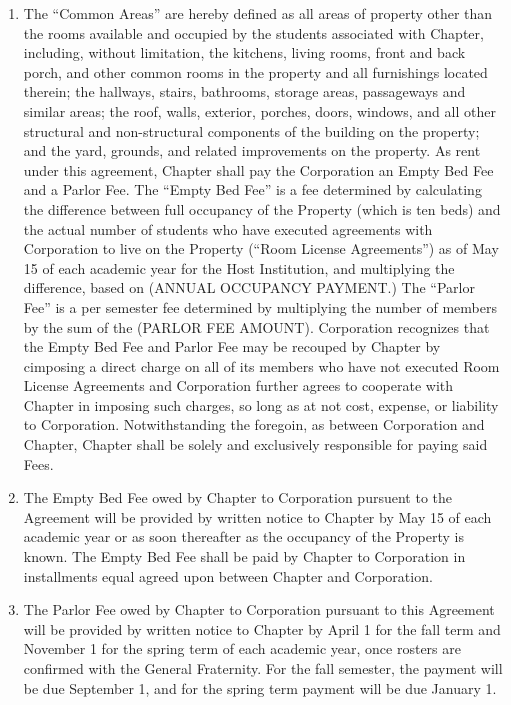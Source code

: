 \documentclass[12pt]{article}
\begin{document}
\begin{enumerate}
        \item The ``Common Areas'' are hereby defined as all areas of property other than the rooms available and occupied by the students associated with Chapter, including, without limitation, the kitchens, living rooms, front and back porch, and other common rooms in the property and all furnishings located therein; the hallways, stairs, bathrooms, storage areas, passageways and similar areas; the roof, walls, exterior, porches, doors, windows, and all other structural and non-structural components of the building on the property; and the yard, grounds, and related improvements on the property.
                As rent under this agreement, Chapter shall pay the Corporation an Empty Bed Fee and a Parlor Fee.
                The ``Empty Bed Fee'' is a fee determined by calculating the difference between full occupancy of the Property (which is ten beds) and the actual number of students who have executed agreements with Corporation to live on the Property (``Room License Agreements'') as of May 15 of each academic year for the Host Institution, and multiplying the difference, based on (ANNUAL OCCUPANCY PAYMENT.)
                The ``Parlor Fee'' is a per semester fee determined by multiplying the number of members by the sum of the (PARLOR FEE AMOUNT).
                Corporation recognizes that the Empty Bed Fee and Parlor Fee may be recouped by Chapter by cimposing a direct charge on all of its members who have not executed Room License Agreements and Corporation further agrees to cooperate with Chapter in imposing such charges, so long as at not cost, expense, or liability to Corporation.
                Notwithstanding the foregoin, as between Corporation and Chapter, Chapter shall be solely and exclusively responsible for paying said Fees.

        \item The Empty Bed Fee owed by Chapter to Corporation pursuent to the Agreement will be provided by written notice to Chapter by May 15 of each academic year or as soon thereafter as the occupancy of the Property is known.
                The Empty Bed Fee shall be paid by Chapter to Corporation in installments equal agreed upon between Chapter and Corporation.

        \item The Parlor Fee owed by Chapter to Corporation pursuant to this Agreement will be provided by written notice to Chapter by April 1 for the fall term and November 1 for the spring term of each academic year, once rosters are confirmed with the General Fraternity.
                For the fall semester, the payment will be due September 1, and for the spring term payment will be due January 1.


\end{enumerate}
\end{document}

